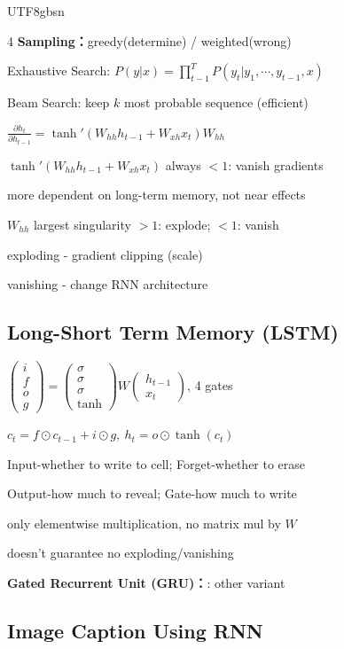 \documentclass[8pt,a4paper]{extarticle}
\newcommand{\entry}[1]{\vspace{3pt}\noindent\textbf{#1：}}
\begin{document}
\begin{CJK*}{UTF8}{gbsn}
\begin{multicols*}{4}
\entry{Sampling}greedy(determine) / weighted(wrong)

Exhaustive Search: $P(y|x) = \displaystyle\prod_{t-1}^T P(y_t|y_1,\cdots,y_{t-1},x)$

Beam Search: keep $k$ most probable sequence (efficient)

$\frac{\partial h_t}{\partial h_{t-1}} = \tanh'(W_{hh}h_{t-1}+W_{xh}x_t)W_{hh}$

$\tanh'(W_{hh}h_{t-1}+W_{xh}x_t)$ always $<1$: vanish gradients

more dependent on long-term memory, not near effects

$W_{hh}$ largest singularity $>1$: explode; $<1$: vanish

exploding - gradient clipping (scale)

vanishing - change RNN architecture

\subsection*{Long-Short Term Memory (LSTM)}

$\left(\begin{array}{cc}
    i \\ f \\ o \\ g
\end{array}\right) = \left(\begin{array}{cc}
    \sigma \\ \sigma \\ \sigma \\ \tanh
\end{array}\right) W \left(\begin{array}{cc}
    h_{t-1} \\ x_t
\end{array}\right)$, 4 gates

$c_t = f \odot c_{t-1} + i \odot g,\ h_t = o \odot \tanh(c_t)$

Input-whether to write to cell; Forget-whether to erase

Output-how much to reveal; Gate-how much to write

only elementwise multiplication, no matrix mul by $W$

doesn't guarantee no exploding/vanishing

\entry{Gated Recurrent Unit (GRU)}: other variant

\subsection*{Image Caption Using RNN}


\end{multicols*}
\end{CJK*}
\end{document}
